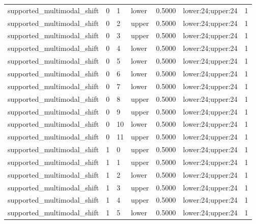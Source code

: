 \documentclass{article}
\begin{document}
\begin{table}[tbp]
{\begin{tabular}{lllllll}
supported\_multimodal\_shift & 0 & 1 & lower & 0.5000 & lower:24;upper:24 & 1 \\
supported\_multimodal\_shift & 0 & 2 & upper & 0.5000 & lower:24;upper:24 & 1 \\
supported\_multimodal\_shift & 0 & 3 & upper & 0.5000 & lower:24;upper:24 & 1 \\
supported\_multimodal\_shift & 0 & 4 & lower & 0.5000 & lower:24;upper:24 & 1 \\
supported\_multimodal\_shift & 0 & 5 & lower & 0.5000 & lower:24;upper:24 & 1 \\
supported\_multimodal\_shift & 0 & 6 & lower & 0.5000 & lower:24;upper:24 & 1 \\
supported\_multimodal\_shift & 0 & 7 & lower & 0.5000 & lower:24;upper:24 & 1 \\
supported\_multimodal\_shift & 0 & 8 & upper & 0.5000 & lower:24;upper:24 & 1 \\
supported\_multimodal\_shift & 0 & 9 & upper & 0.5000 & lower:24;upper:24 & 1 \\
supported\_multimodal\_shift & 0 & 10 & lower & 0.5000 & lower:24;upper:24 & 1 \\
supported\_multimodal\_shift & 0 & 11 & upper & 0.5000 & lower:24;upper:24 & 1 \\
supported\_multimodal\_shift & 1 & 0 & upper & 0.5000 & lower:24;upper:24 & 1 \\
supported\_multimodal\_shift & 1 & 1 & upper & 0.5000 & lower:24;upper:24 & 1 \\
supported\_multimodal\_shift & 1 & 2 & lower & 0.5000 & lower:24;upper:24 & 1 \\
supported\_multimodal\_shift & 1 & 3 & upper & 0.5000 & lower:24;upper:24 & 1 \\
supported\_multimodal\_shift & 1 & 4 & upper & 0.5000 & lower:24;upper:24 & 1 \\
supported\_multimodal\_shift & 1 & 5 & lower & 0.5000 & lower:24;upper:24 & 1 \\
\bottomrule
\end{tabular}
}
\end{table}

\clearpage
\end{document}
